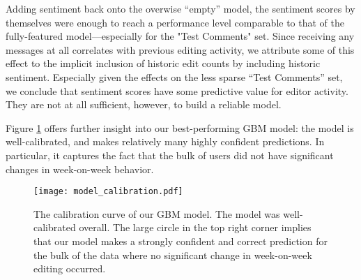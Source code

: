 \documentclass[letterpaper, 10 pt, conference]{ieeeconf}  %
\begin{document}
Adding sentiment back onto the overwise ``empty'' model, the sentiment scores by themselves were enough to reach a performance level comparable to that of the fully-featured model---especially for the "Test Comments" set. Since receiving any messages at all correlates with previous editing activity, we attribute some of this effect to the implicit inclusion of historic edit counts by including historic sentiment. Especially given the effects on the less sparse ``Test Comments'' set, we conclude that sentiment scores have some predictive value for editor activity. They are not at all sufficient, however, to build a reliable model.

Figure \ref{fig:calibration} offers further insight into our best-performing GBM model: the model is well-calibrated, and makes relatively many highly confident predictions. In particular, it captures the fact that the bulk of users did not have significant changes in week-on-week behavior.


   
   \begin{figure}[thpb]
      \centering
      \texttt{[image: model\_calibration.pdf]}
      \caption{The calibration curve of our GBM model. The model was well-calibrated overall. The large circle in the top right corner implies that our model makes a strongly confident and correct prediction for the bulk of the data where no significant change in week-on-week editing occurred.}
      \label{fig:calibration}
   \end{figure}
   
\end{document}
